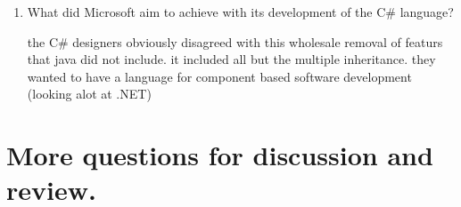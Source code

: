 \begin{enumerate}
\begin{answer}
    \end{answer}

  \item What did Microsoft aim to achieve with its development of the
    C\# language?

  \begin{answer}

   the C\# designers obviously disagreed with this wholesale removal of
   featurs that java did not include. it included all but the multiple
   inheritance. they wanted to have a language for component based
   software development (looking alot at .NET)


    \end{answer}

  \end{enumerate}



\section{More questions for discussion and review.}

